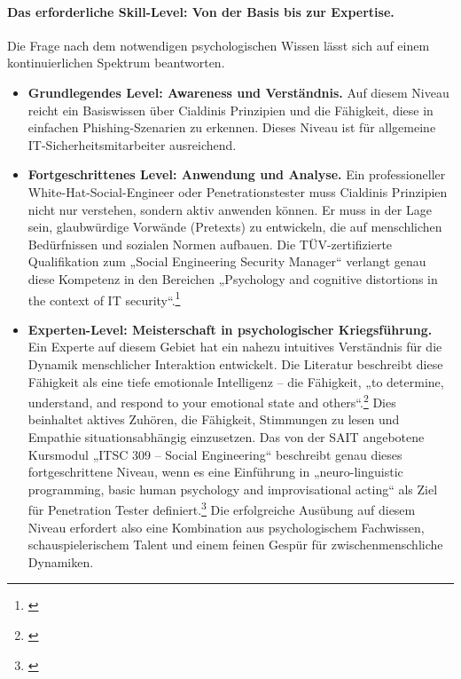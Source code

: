 \documentclass[10pt,a4paper]{article}
\begin{document}
	\paragraph{Das erforderliche Skill-Level: Von der Basis bis zur Expertise.}
	Die Frage nach dem notwendigen psychologischen Wissen lässt sich auf einem kontinuierlichen Spektrum beantworten.
	\begin{itemize}
		\item \textbf{Grundlegendes Level: Awareness und Verständnis.} Auf diesem Niveau reicht ein Basiswissen über Cialdinis Prinzipien und die Fähigkeit, diese in einfachen Phishing-Szenarien zu erkennen. Dieses Niveau ist für allgemeine IT-Sicherheitsmitarbeiter ausreichend.
		\item \textbf{Fortgeschrittenes Level: Anwendung und Analyse.} Ein professioneller White-Hat-Social-Engineer oder Penetrationstester muss Cialdinis Prinzipien nicht nur verstehen, sondern aktiv anwenden können. Er muss in der Lage sein, glaubwürdige Vorwände (Pretexts) zu entwickeln, die auf menschlichen Bedürfnissen und sozialen Normen aufbauen. Die TÜV-zertifizierte Qualifikation zum „Social Engineering Security Manager“ verlangt genau diese Kompetenz in den Bereichen „Psychology and cognitive distortions in the context of IT security“.\footnote{\cite{TUVRheinland}}
		\item \textbf{Experten-Level: Meisterschaft in psychologischer Kriegsführung.} Ein Experte auf diesem Gebiet hat ein nahezu intuitives Verständnis für die Dynamik menschlicher Interaktion entwickelt. Die Literatur beschreibt diese Fähigkeit als eine tiefe emotionale Intelligenz – die Fähigkeit, „to determine, understand, and respond to your emotional state and others“.\footnote{\cite{SESkills}} Dies beinhaltet aktives Zuhören, die Fähigkeit, Stimmungen zu lesen und Empathie situationsabhängig einzusetzen. Das von der SAIT angebotene Kursmodul „ITSC 309 – Social Engineering“ beschreibt genau dieses fortgeschrittene Niveau, wenn es eine Einführung in „neuro-linguistic programming, basic human psychology and improvisational acting“ als Ziel für Penetration Tester definiert.\footnote{\cite{SAITCourse}} Die erfolgreiche Ausübung auf diesem Niveau erfordert also eine Kombination aus psychologischem Fachwissen, schauspielerischem Talent und einem feinen Gespür für zwischenmenschliche Dynamiken.
	\end{itemize}
	
\end{document}
